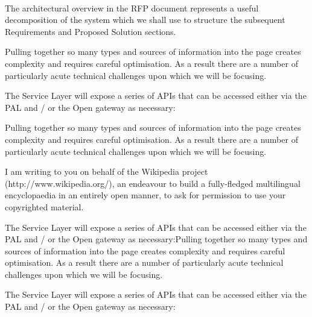 \documentclass[10pt, paper=A4, parskip=full,asymTypB, subject=afteropening, subject=left,Farrukh
               enlargefirstpage ]{scrlttr2}
\begin{document}




\begin{letter}{%
\tystrrecipient \\
\tystrrecipientaddress
}
\opening{\tystropening}

The architectural overview in the RFP document represents a useful decomposition of the system which we shall use to structure the subsequent Requirements and Proposed Solution sections.

Pulling together so many types and sources of information into the page creates complexity and requires careful optimisation. As a result there are a number of particularly acute technical challenges upon which we will be focusing.

The Service Layer will expose a series of APIs that can be accessed either via the PAL and / or the Open gateway as necessary:

Pulling together so many types and sources of information into the page creates complexity and requires careful optimisation. As a result there are a number of particularly acute technical challenges upon which we will be focusing.

 
I am writing to you on behalf of the Wikipedia project (http://www.wikipedia.org/),
an endeavour to build a fully-fledged multilingual encyclopaedia in an entirely
open manner, to ask for permission to use your copyrighted material.

The Service Layer will expose a series of APIs that can be accessed either via the PAL and / or the Open gateway as necessary:Pulling together so many types and sources of information into the page creates complexity and requires careful optimisation. As a result there are a number of particularly acute technical challenges upon which we will be focusing.

The Service Layer will expose a series of APIs that can be accessed either via the PAL and / or the Open gateway as necessary:


\end{letter}
\end{document}
